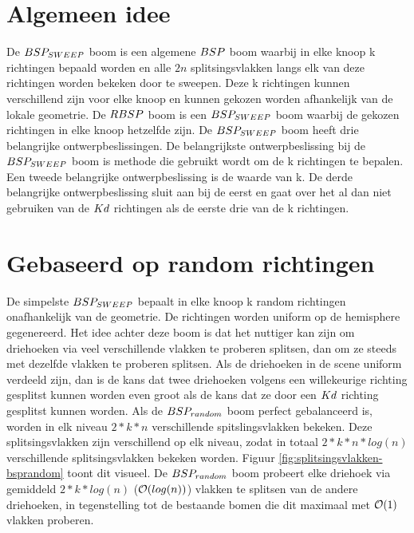 \section{Algemeen idee}
    De $BSP_{SWEEP}$ boom is een algemene $BSP$ boom waarbij in elke knoop k richtingen bepaald worden en alle $2n$ splitsingsvlakken langs elk van deze richtingen worden bekeken door te sweepen.
    Deze k richtingen kunnen verschillend zijn voor elke knoop en kunnen gekozen worden afhankelijk van de lokale geometrie.
    De $RBSP$ boom is een $BSP_{SWEEP}$ boom waarbij de gekozen richtingen in elke knoop hetzelfde zijn.
    De $BSP_{SWEEP}$ boom heeft drie belangrijke ontwerpbeslissingen.
    De belangrijkste ontwerpbeslissing bij de $BSP_{SWEEP}$ boom is methode die gebruikt wordt om de k richtingen te bepalen.
    Een tweede belangrijke ontwerpbeslissing is de waarde van k.
    De derde belangrijke ontwerpbeslissing sluit aan bij de eerst en gaat over het al dan niet gebruiken van de $Kd$ richtingen als de eerste drie van de k richtingen.
    \\


\section{Gebaseerd op random richtingen}
De simpelste $BSP_{SWEEP}$ bepaalt in elke knoop k random richtingen onafhankelijk van de geometrie.
De richtingen worden uniform op de hemisphere gegenereerd.
Het idee achter deze boom is dat het nuttiger kan zijn om driehoeken via veel verschillende vlakken te proberen splitsen, dan om ze steeds met dezelfde vlakken te proberen splitsen.
Als de driehoeken in de scene uniform verdeeld zijn, dan is de kans dat twee driehoeken volgens een willekeurige richting gesplitst kunnen worden even groot als de kans dat ze door een $Kd$ richting gesplitst kunnen worden.
Als de $BSP_{random}$ boom perfect gebalanceerd is, worden in elk niveau $2*k*n$ verschillende spitslingsvlakken bekeken.
Deze splitsingsvlakken zijn verschillend op elk niveau, zodat in totaal $2*k*n*log(n)$ verschillende splitsingsvlakken bekeken worden.
Figuur \ref{fig:splitsingsvlakken-bsprandom} toont dit visueel.
De $BSP_{random}$ boom probeert elke driehoek via gemiddeld $2*k*log(n)$ ($\mathcal{O}(log(n))$) vlakken te splitsen van de andere driehoeken, in tegenstelling tot de bestaande bomen die dit maximaal met $\mathcal{O}(1)$ vlakken proberen.\\

